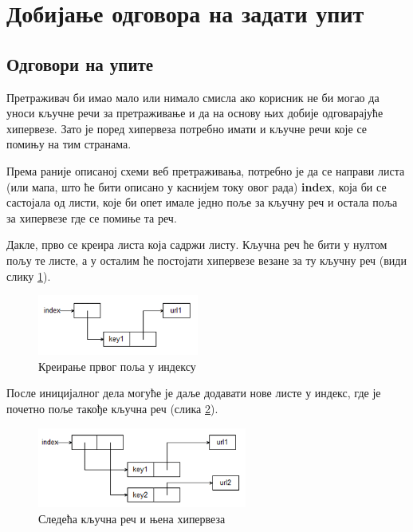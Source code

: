 \section{Добијање одговора на задати упит}

\subsection{Одговори на упите}

Претраживач би имао мало или нимало смисла ако корисник не би могао да уноси кључне речи за претраживање и да на основу њих добије одговарајуће хипервезе. Зато је поред хипервеза потребно имати и кључне речи које се помињу на тим странама.

Према раније описаној схеми веб претраживања, потребно је да се направи листа (или мапа, што ће бити описано у каснијем току овог рада) \textbf{index}, која би се састојала од листи, које би опет имале једно поље за кључну реч и остала поља за хипервезе где се помиње та реч.

Дакле, прво се креира листа која садржи листу. Кључна реч ће бити у нултом пољу те листе, а у осталим ће постојати хипервезе везане за ту кључну реч (види слику \ref{slike:indeks1}).

\begin{figure}[here]
\centering
\includegraphics[height=75px, width=200px]{index1.png}
\caption{Креирање првог поља у индексу}
\label{slike:indeks1}
\end{figure}

После иницијалног дела могуће је даље додавати нове листе у индекс, где је почетно поље такође кључна реч (слика \ref{slike:index2}).\\

\begin{figure}[here]
\centering
\includegraphics[height=100px, width=260px]{index2.png}
\caption{Следећа кључна реч и њена хипервеза}
\label{slike:index2}
\end{figure}

